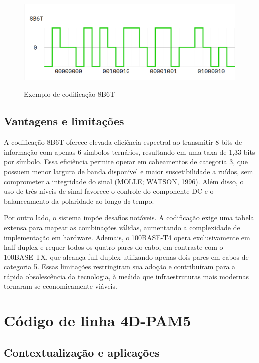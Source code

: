 \documentclass[conference]{IEEEtran}
\begin{document}
\begin{figure}[ht]
  \centering
  \caption{Exemplo de codificação 8B6T}
  \includegraphics[width=0.9\linewidth,trim={2 0 0 0},clip]{8b6t-example.png}
  \label{fig:8b6t-example}
\end{figure}

\subsection{Vantagens e limitações}

A codificação 8B6T oferece elevada eficiência espectral ao transmitir 8 bits de informação com apenas 6 símbolos ternários, resultando em uma taxa de 1,33 bits por símbolo. Essa eficiência permite operar em cabeamentos de categoria 3, que possuem menor largura de banda disponível e maior suscetibilidade a ruídos, sem comprometer a integridade do sinal (MOLLE; WATSON, 1996). Além disso, o uso de três níveis de sinal favorece o controle do componente DC e o balanceamento da polaridade ao longo do tempo.

Por outro lado, o sistema impõe desafios notáveis. A codificação exige uma tabela extensa para mapear as combinações válidas, aumentando a complexidade de implementação em hardware. Ademais, o 100BASE-T4 opera exclusivamente em half-duplex e requer todos os quatro pares do cabo, em contraste com o 100BASE-TX, que alcança full-duplex utilizando apenas dois pares em cabos de categoria 5. Essas limitações restringiram sua adoção e contribuíram para a rápida obsolescência da tecnologia, à medida que infraestruturas mais modernas tornaram-se economicamente viáveis.

\section{Código de linha 4D-PAM5}

\subsection{Contextualização e aplicações}
\end{document}
